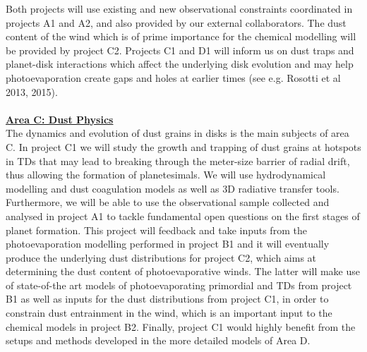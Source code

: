 \documentclass[10pt,fleqn,twoside,a4paper]{article}
\newcommand{\AreacolC}{\color{YellowOrange}}
\begin{document}
Both projects will use existing and new observational
constraints coordinated in projects A1 and A2, and also provided by
our external collaborators. The dust 
content of the wind which is of prime importance for the chemical
modelling will be provided by project C2. Projects C1 and D1 will
inform us on dust traps and 
planet-disk
interactions which affect the underlying disk evolution and may help
photoevaporation create gaps and holes at 
earlier times (see e.g. Rosotti et al 2013, 2015).\\ 

%
\mbox{}\vspace{1em}\\
\noindent\underline{\bf\AreacolC Area C: Dust Physics}\\
\noindent The dynamics and evolution of dust grains in disks is the
main subjects of area C. In project C1 we will study the growth and
trapping of dust grains at hotspots in TDs that may lead
to breaking through the meter-size barrier of radial drift, thus
allowing the formation of planetesimals. We will use hydrodynamical
modelling and dust coagulation models as well as 3D 
radiative transfer tools. Furthermore, we will be able to use the
observational sample collected and analysed in project A1 to tackle
fundamental open questions on the first stages of planet
formation. This project will feedback and take inputs from the
photoevaporation modelling performed in project B1 and it will
eventually produce
the underlying dust distributions for project C2, which aims at
determining the dust content of photoevaporative winds. The latter
will make use of state-of-the art models of photoevaporating
primordial and TDs from project B1 as well as inputs for the dust distributions from
project C1, in order to constrain dust entrainment in the wind, which
is an important input to the chemical models in project B2. Finally,
project C1 would highly benefit from the setups and methods developed
in the more detailed models of Area D.\\ 


\end{document}
